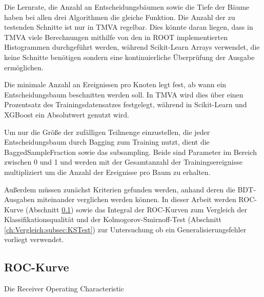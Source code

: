 Die Lernrate, die Anzahl an Entscheidungsb\"aumen sowie die Tiefe der B\"aume haben bei allen drei Algorithmen die gleiche Funktion. Die Anzahl der zu testenden Schnitte ist nur in TMVA regelbar. Dies k\"onnte daran liegen, dass in TMVA viele Berechnungen mithilfe von den in ROOT implementierten Histogrammen durchgef\"uhrt werden, w\"ahrend Scikit-Learn Arrays verwendet, die keine Schnitte ben\"otigen sondern eine kontinuierliche \"Uberpr\"ufung der Ausgabe erm\"oglichen. 

Die minimale Anzahl an Ereignissen pro Knoten legt fest, ab wann ein Entscheidungsbaum beschnitten werden soll. In TMVA wird dies \"uber einen Prozentsatz des Trainingsdatensatzes festgelegt, w\"ahrend in Scikit-Learn und XGBoost ein Absolutwert genutzt wird.

Um nur die Gr\"o\ss e der zuf\"alligen Teilmenge einzustellen, die jeder Entscheidungsbaum durch Bagging zum Training nutzt, dient die BaggedSampleFraction sowie das subsampling. Beide sind Parameter im Bereich zwischen 0 und 1 und werden mit der Gesamtanzahl der Trainingsereignisse multipliziert um die Anzahl der Ereignisse pro Baum zu erhalten.

Au\ss erdem m\"ussen zun\"achst Kriterien gefunden werden, anhand deren die BDT-Ausgaben miteinander verglichen werden k\"onnen. In dieser Arbeit werden ROC-Kurve (Abschnitt \ref{ch:Vergleich:subsec:ROC}) sowie das Integral der ROC-Kurven zum Vergleich der Klassifikationsqualit\"at und der Kolmogorov-Smirnoff-Test (Abschnitt \ref{ch:Vergleich:subsec:KSTest}) zur Untersuchung ob ein Generalisierungsfehler vorliegt verwendet.

\subsection{ROC-Kurve}
\label{ch:Vergleich:subsec:ROC}

Die Receiver Operating Characteristic

